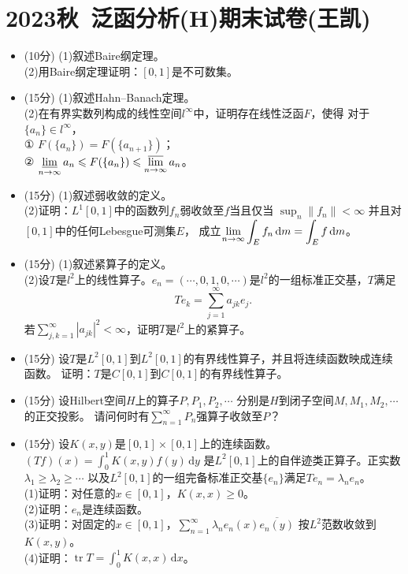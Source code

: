 \section{2023秋\ 泛函分析(H)期末试卷(王凯)}
\begin{itemize}
\item[1.] (10分) (1)叙述Baire纲定理。\\
(2)用Baire纲定理证明：$[0,1]$是不可数集。


\item[2.] (15分) (1)叙述Hahn--Banach定理。\\
(2)在有界实数列构成的线性空间$l^\infty$中，证明存在线性泛函$F$，使得
对于$\{a_n\} \in l^\infty$，\\
① $F(\{a_n\}) = F(\{a_{n+1}\})$；\\
② $\displaystyle \varliminf_{n \to \infty} a_n \leqslant F(\{a_n\}) \leqslant \varlimsup_{n \to \infty} a_n$。

\item[3.] (15分) (1)叙述弱收敛的定义。\\
(2)证明：$L^1[0,1]$中的函数列$f_n$弱收敛至$f$当且仅当
$\displaystyle \sup_n \| f_n \| < \infty$
并且对$[0,1]$中的任何Lebesgue可测集$E$，
成立$\displaystyle \lim_{n \to \infty}\int_E f_n \,{\rm d}m = \int_E f \,{\rm d}m$。

\item[4.] (15分) (1)叙述紧算子的定义。\\
(2)设$T$是$l^2$上的线性算子。$e_n = (\cdots,0,1,0,\cdots)$是$l^2$的一组标准正交基，$T$满足
\[Te_k = \sum_{j = 1}^\infty a_{jk}e_j.\]
若$\displaystyle \sum_{j,k=1}^\infty |a_{jk}|^2 < \infty$，证明$T$是$l^2$上的紧算子。

\item[5.] (15分) 设$T$是$L^2[0,1]$到$L^2[0,1]$的有界线性算子，并且将连续函数映成连续函数。
证明：$T$是$C[0,1]$到$C[0,1]$的有界线性算子。

\item[6.] (15分) 设Hilbert空间$H$上的算子$P,P_1,P_2,\cdots$
分别是$H$到闭子空间$M,M_1,M_2,\cdots$的正交投影。
请问何时有$\displaystyle \sum_{n = 1}^\infty P_n$强算子收敛至$P$？

\item[7.] (15分) 设$K(x,y)$是$[0,1] \times [0,1]$上的连续函数。
$\displaystyle (Tf)(x) = \int_0^1 K(x,y)f(y) \,\mathrm{d}y$
是$L^2[0,1]$上的自伴迹类正算子。正实数$\lambda_1 \geqslant \lambda_2 \geqslant \cdots$
以及$L^2[0,1]$的一组完备标准正交基$\{e_n\}$满足$Te_n = \lambda_ne_n$。\\
(1)证明：对任意的$x\in [0,1]$，$K(x,x) \geqslant 0$。\\
(2)证明：$e_n$是连续函数。\\
(3)证明：对固定的$x \in [0,1]$，$\displaystyle \sum_{n=1}^\infty \lambda_ne_n(x)\overline{e_n(y)}$
按$L^2$范数收敛到$K(x,y)$。\\
(4)证明：$\displaystyle \operatorname{tr} T = \int_0^1 K(x,x) \,\mathrm{d}x$。
\end{itemize}

